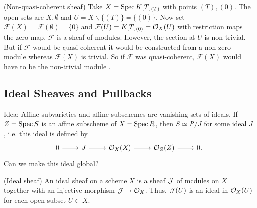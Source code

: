\documentclass[a4paper,11pt]{article}
\begin{document}
			\begin{eg}
				(Non-quasi-coherent sheaf) Take $X=\operatorname{Spec} K[T]_{(T)}$ with points $(T), (0)$. The open sets are $X,\emptyset$ and $U=X\backslash\{(T)\}=\{(0)\}$. Now set $\mathcal{F}(X)=\mathcal{F}(\emptyset)=\{0\}$ and $\mathcal{F}(U)=K[T]_{(0)}=\mathcal{O}_X(U)$ with restriction maps the zero map. $\mathcal{F}$ is a sheaf of modules. However, the section at $U$ is non-trivial. But if $\mathcal{F}$ would be quasi-coherent it would be constructed from a non-zero module whereas $\mathcal{F}(X)$ is trivial. So if $\mathcal{F}$ was quasi-coherent, $\mathcal{F}(X)$ would have to be the non-trivial module \contradiction.
			\end{eg}

		
		\subsection{Ideal Sheaves and Pullbacks}
			
			\noindent Idea: Affine subvarieties and affine subschemes are vanishing sets of ideals. If $Z=\operatorname{Spec} S$ is an affine subscheme of $X=\operatorname{Spec} R$, then $S\simeq R/J$ for some ideal $J$, i.e. this ideal is defined by
			\begin{equation*}
				\begin{tikzcd}
					0\ar[r] & J\ar[r] & \O_X(X)\ar[r] & \O_Z(Z)\ar[r] & 0.
				\end{tikzcd}
			\end{equation*}
			Can we make this ideal global?

			\begin{defi}
				(Ideal sheaf) An ideal sheaf on a scheme $X$ is a sheaf $\mathcal{J}$ of modules on $X$ together with an injective morphism $\mathcal{J}\rightarrow\mathcal{O}_X$. Thus, $\mathcal{J}(U)$ is an ideal in $\mathcal{O}_X(U)$ for each open subset $U\subset X$.
			\end{defi}
\end{document}
